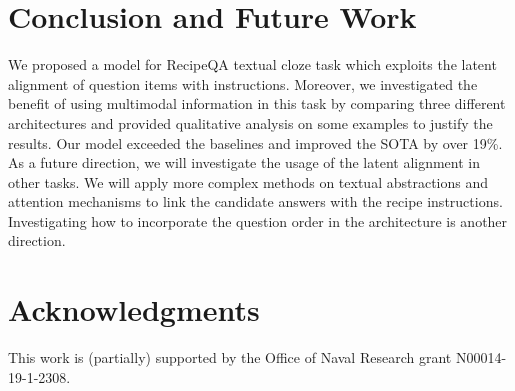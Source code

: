 \documentclass[11pt,a4paper]{article}
\begin{document}
\section{Conclusion and Future Work}
We proposed a model for RecipeQA textual cloze task which exploits the latent alignment of question items with instructions. Moreover, we investigated the benefit of using multimodal information in this task by comparing three different architectures and provided qualitative analysis on some examples to justify the results. Our model exceeded the baselines and improved the SOTA by over 19\%.
As a future direction, we will investigate the usage of the latent alignment in other tasks. We will apply more complex methods on textual abstractions and attention mechanisms to link the candidate answers with the recipe instructions. Investigating how to incorporate the question order in the architecture is another direction.

\section*{Acknowledgments}
This work is (partially) supported by the Office of Naval Research grant N00014-19-1-2308.



\end{document}
